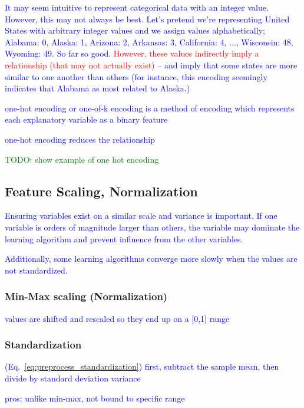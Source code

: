 \textcolor{blue}{It may seem intuitive to represent categorical data with an integer value. However, this may not always be best. Let's pretend we're representing United States with arbitrary integer values and we assign values alphabetically; Alabama: 0, Alaska: 1, Arizona: 2, Arkansas: 3, California: 4, ..., Wisconsin: 48, Wyoming: 49. So far so good. \textcolor{red}{However, these values indirectly imply a relationship (that may not actually exist)} -- and imply that some states are more similar to one another than others (for instance, this encoding seemingly indicates that Alabama as most related to Alaska.) }

\textcolor{blue}{{one-hot encoding} or one-of-k encoding is a method of encoding which represents each explanatory variable as a binary feature}

\textcolor{blue}{one-hot encoding reduces the relationship}

\textcolor{green}{TODO: show example of one hot encoding}

\subsection{Feature Scaling, Normalization}

\textcolor{blue}{Ensuring variables exist on a similar scale and variance is important. If one variable is orders of magnitude larger than others, the variable may dominate the learning algorithm and prevent influence from the other variables.}

\textcolor{blue}{Additionally, some learning algorithms converge more slowly when the values are not standardized.}

\subsubsection{Min-Max scaling (Normalization)}

\textcolor{blue}{values are shifted and rescaled so they end up on a [0,1] range}

\subsubsection{Standardization}

\textcolor{blue}{(Eq.~\ref{eq:preprocess_standardization}) first, subtract the sample mean, then divide by standard deviation variance}

\textcolor{blue}{pros: unlike min-max, not bound to specific range}

